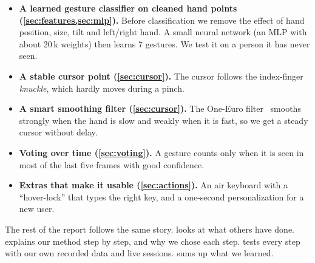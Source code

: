 \begin{itemize}
\item \textbf{A learned gesture classifier on cleaned hand points
(\cref{sec:features,sec:mlp}).} Before classification we remove the
effect of hand position, size, tilt and left/right hand. A small neural
network (an MLP with about 20\,k weights) then learns 7 gestures. We test it
on a person it has never seen.
\item \textbf{A stable cursor point (\cref{sec:cursor}).} The cursor follows the
index-finger \emph{knuckle}, which hardly moves during a pinch.
\item \textbf{A smart smoothing filter (\cref{sec:cursor}).} The One-Euro
filter~\cite{casiez2012oneeuro} smooths strongly when the hand is slow and
weakly when it is fast, so we get a steady cursor without delay.
\item \textbf{Voting over time (\cref{sec:voting}).} A gesture counts only
when it is seen in most of the last five frames with good confidence.
\item \textbf{Extras that make it usable (\cref{sec:actions}).} An air keyboard
with a ``hover-lock'' that types the right key, and a one-second
personalization for a new user.
\end{itemize}

The rest of the report follows the same story.  looks at
what others have done.  explains our method step by step,
and why we chose each step.  tests every step with our own
recorded data and live sessions.  sums up what we learned.
